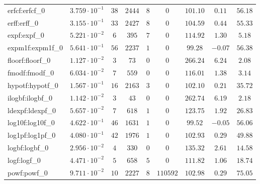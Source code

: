 \begin{tabular}{|l|c|c|c|c|c|c|c|c|}
erfcf:erfcf\_0               & $ 3.759 \cdot 10^{-1} $ & $ 38     $ & $ 2444  $ & $ 8   $ & $ 0      $ & $ 101.10      $ & $ 0.11    $ & $ 56.18   $ \\
erff:erff\_0                 & $ 3.155 \cdot 10^{-1} $ & $ 33     $ & $ 2427  $ & $ 8   $ & $ 0      $ & $ 104.59      $ & $ 0.44    $ & $ 55.33   $ \\
expf:expf\_0                 & $ 5.221 \cdot 10^{-2} $ & $ 6      $ & $ 395   $ & $ 7   $ & $ 0      $ & $ 114.92      $ & $ 1.30    $ & $ 5.18    $ \\
expm1f:expm1f\_0             & $ 5.641 \cdot 10^{-1} $ & $ 56     $ & $ 2237  $ & $ 1   $ & $ 0      $ & $ 99.28       $ & $ -0.07   $ & $ 56.38   $ \\
floorf:floorf\_0             & $ 1.127 \cdot 10^{-2} $ & $ 3      $ & $ 73    $ & $ 0   $ & $ 0      $ & $ 266.24      $ & $ 6.24    $ & $ 2.08    $ \\
fmodf:fmodf\_0               & $ 6.034 \cdot 10^{-2} $ & $ 7      $ & $ 559   $ & $ 0   $ & $ 0      $ & $ 116.01      $ & $ 1.38    $ & $ 3.14    $ \\
hypotf:hypotf\_0             & $ 1.567 \cdot 10^{-1} $ & $ 16     $ & $ 2163  $ & $ 3   $ & $ 0      $ & $ 102.10      $ & $ 0.21    $ & $ 35.72   $ \\
ilogbf:ilogbf\_0             & $ 1.142 \cdot 10^{-2} $ & $ 3      $ & $ 43    $ & $ 0   $ & $ 0      $ & $ 262.74      $ & $ 6.19    $ & $ 2.18    $ \\
ldexpf:ldexpf\_0             & $ 5.657 \cdot 10^{-2} $ & $ 7      $ & $ 618   $ & $ 1   $ & $ 0      $ & $ 123.75      $ & $ 1.92    $ & $ 26.83   $ \\
log10f:log10f\_0             & $ 4.622 \cdot 10^{-1} $ & $ 46     $ & $ 1631  $ & $ 1   $ & $ 0      $ & $ 99.52       $ & $ -0.05   $ & $ 56.06   $ \\
log1pf:log1pf\_0             & $ 4.080 \cdot 10^{-1} $ & $ 42     $ & $ 1976  $ & $ 1   $ & $ 0      $ & $ 102.93      $ & $ 0.29    $ & $ 49.88   $ \\
logbf:logbf\_0               & $ 2.956 \cdot 10^{-2} $ & $ 4      $ & $ 330   $ & $ 0   $ & $ 0      $ & $ 135.32      $ & $ 2.61    $ & $ 14.58   $ \\
logf:logf\_0                 & $ 4.471 \cdot 10^{-2} $ & $ 5      $ & $ 658   $ & $ 5   $ & $ 0      $ & $ 111.82      $ & $ 1.06    $ & $ 18.74   $ \\
powf:powf\_0                 & $ 9.711 \cdot 10^{-2} $ & $ 10     $ & $ 2227  $ & $ 8   $ & $ 110592 $ & $ 102.98      $ & $ 0.29    $ & $ 75.05   $ \\

\end{tabular}
